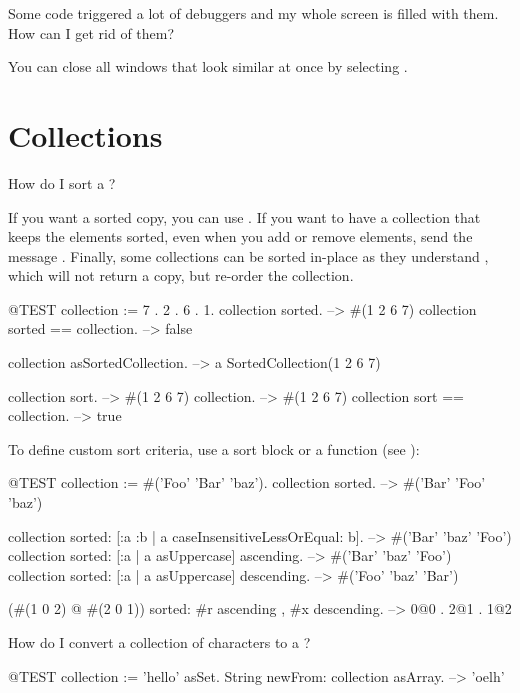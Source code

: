 \documentclass[a4paper,10pt,twoside]{book}
\begin{document}
\begin{faq}
Some code triggered a lot of debuggers and my whole screen is filled with them.
How can I get rid of them?
\end{faq}
\answer
You can close all windows that look similar at once by selecting .

\section{Collections}

\begin{faq}
How do I sort a ?
\end{faq}
\answer
If you want a sorted copy, you can use .
If you want to have a collection that keeps the elements sorted, even when you add or remove elements, send the message .
Finally, some collections can be sorted in-place as they understand , which will not return a copy, but re-order the collection.

\begin{code}{@TEST}
collection := {7 . 2 . 6 . 1}.
collection sorted. --> #(1 2 6 7)
collection sorted == collection. --> false

collection asSortedCollection. --> a SortedCollection(1 2 6 7)

collection sort. --> #(1 2 6 7)
collection. --> #(1 2 6 7)
collection sort == collection. --> true
\end{code}

To define custom sort criteria, use a sort block or a function (see ):

\begin{code}{@TEST}
collection := #('Foo' 'Bar' 'baz').
collection sorted. --> #('Bar' 'Foo' 'baz')

collection sorted: [:a :b | a caseInsensitiveLessOrEqual: b]. --> #('Bar' 'baz' 'Foo')
collection sorted: [:a | a asUppercase] ascending. --> #('Bar' 'baz' 'Foo')
collection sorted: [:a | a asUppercase] descending. --> #('Foo' 'baz' 'Bar')

(#(1 0 2) @ #(2 0 1)) sorted: #r ascending , #x descending. --> {0@0 . 2@1 . 1@2}
\end{code}

\begin{faq}
How do I convert a collection of characters to a ?
\end{faq}
\answer
\begin{code}{@TEST}
collection := 'hello' asSet.
String newFrom: collection asArray. --> 'oelh'
\end{code}
\end{document}
